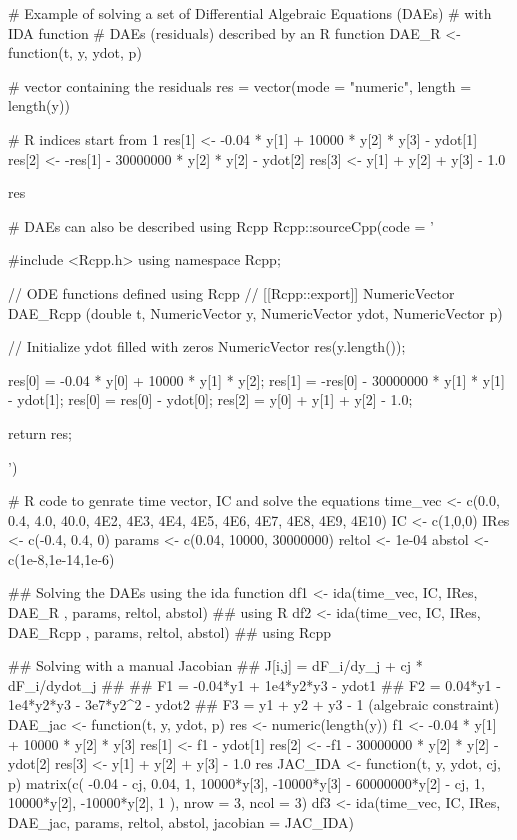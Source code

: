 \documentclass[letterpaper]{book}
\begin{document}
\begin{Examples}
\begin{ExampleCode}
# Example of solving a set of Differential Algebraic Equations (DAEs)
# with IDA function
# DAEs (residuals) described by an R function
DAE_R <- function(t, y, ydot, p){

  # vector containing the residuals
  res = vector(mode = "numeric", length = length(y))

  # R indices start from 1
  res[1] <- -0.04 * y[1] + 10000 * y[2] * y[3] - ydot[1]
  res[2] <- -res[1] - 30000000 * y[2] * y[2] - ydot[2]
  res[3] <- y[1] + y[2] + y[3] - 1.0

  res
}

# DAEs can also be described using Rcpp
Rcpp::sourceCpp(code = '

                #include <Rcpp.h>
                using namespace Rcpp;

                // ODE functions defined using Rcpp
                // [[Rcpp::export]]
                NumericVector DAE_Rcpp (double t, NumericVector y, NumericVector ydot, NumericVector p){

                // Initialize ydot filled with zeros
                NumericVector res(y.length());

                res[0] = -0.04 * y[0] + 10000 * y[1] * y[2];
                res[1] = -res[0] - 30000000 * y[1] * y[1] - ydot[1];
                res[0] = res[0] - ydot[0];
                res[2] = y[0] + y[1] + y[2] - 1.0;

                return res;

                }')

# R code to genrate time vector, IC and solve the equations
time_vec <- c(0.0, 0.4, 4.0, 40.0, 4E2, 4E3, 4E4, 4E5, 4E6, 4E7, 4E8, 4E9, 4E10)
IC <- c(1,0,0)
IRes <- c(-0.4, 0.4, 0)
params <- c(0.04, 10000, 30000000)
reltol <- 1e-04
abstol <- c(1e-8,1e-14,1e-6)

## Solving the DAEs using the ida function
df1 <- ida(time_vec, IC, IRes, DAE_R , params, reltol, abstol)           ## using R
df2 <- ida(time_vec, IC, IRes, DAE_Rcpp , params, reltol, abstol)        ## using Rcpp

## Solving with a manual Jacobian
## J[i,j] = dF_i/dy_j + cj * dF_i/dydot_j
##
## F1 = -0.04*y1 + 1e4*y2*y3 - ydot1
## F2 = 0.04*y1 - 1e4*y2*y3 - 3e7*y2^2 - ydot2
## F3 = y1 + y2 + y3 - 1  (algebraic constraint)
DAE_jac <- function(t, y, ydot, p) {
  res <- numeric(length(y))
  f1     <- -0.04 * y[1] + 10000 * y[2] * y[3]
  res[1] <- f1 - ydot[1]
  res[2] <- -f1 - 30000000 * y[2] * y[2] - ydot[2]
  res[3] <- y[1] + y[2] + y[3] - 1.0
  res
}
JAC_IDA <- function(t, y, ydot, cj, p) {
  matrix(c(
    -0.04 - cj,   0.04,    1,
    10000*y[3],  -10000*y[3] - 60000000*y[2] - cj,   1,
    10000*y[2],  -10000*y[2],                         1
  ), nrow = 3, ncol = 3)
}
df3 <- ida(time_vec, IC, IRes, DAE_jac, params, reltol, abstol, jacobian = JAC_IDA)
\end{ExampleCode}
\end{Examples}
\printindex{}
\end{document}
